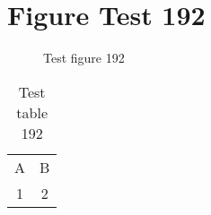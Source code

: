 \documentclass{article}
\begin{document}
\section{Figure Test 192}
\begin{figure}[h]
\caption{Test figure 192}
\end{figure}
\begin{table}[h]
\caption{Test table 192}
\begin{tabular}{cc}
A & B \\
1 & 2
\end{tabular}
\end{table}
\end{document}
